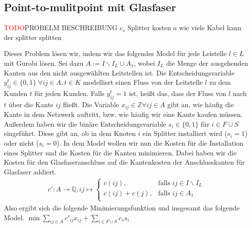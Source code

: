 \documentclass[11pt,a4paper]{article}
\newcommand{\Z}{\mathbb{Z}}
\newcommand{\Q}{\mathbb{Q}}
\newcommand{\TODO}{\textcolor{red}{TODO}}
\theoremstyle{my_th_style1}
\begin{document}
 \subsection{Point-to-mulitpoint mit Glasfaser}
\TODO PROBELM BESCHREIBUNG $c_s$ Splitter kosten $a$ wie viele Kabel kann der splitter splitten

Dieses Problem lösen wir, indem wir das folgendes Model für jede Leistelle $l \in L $ mit Gurobi lösen. Sei dazu $A:= I\backslash I_L \cup A_1$, wobei $I_L$ die Menge der ausgehenden Kanten aus den nicht ausgewählten Leitstellen ist.
Die Entscheidungsvariable $y_{ij}^t \in \{0,1\}\; \forall ij \in A, t \in K$ modelliert einen Fluss von der Leitstelle $l$ zu dem Kunden $t$ für jeden Kunden. Falls $y_{ij}^t=1$ ist, heißt das, dass der Fluss von $l$ nach $t$ über die Kante $ij$ fließt.
Die Variable $x_{ij} \in \Z \forall ij \in A $ gibt an, wie häufig die Kante in dem Netzwerk auftritt, bzw. wie häufig wir eine Kante kaufen müssen. Außerdem haben wir die binäre Entscheidungsvariable $s_i \in \{0,1\}$ für $i \in F \cup S$ eingeführt. Diese gibt an, ob in dem Knoten $i$ ein Splitter installiert wird ($s_i=1$) oder nicht ($s_i=0$). In dem Model wollen wir nun die Kosten für die Installation eines Splitter und die Kosten für die Kanten minimieren. Dabei haben wir die Kosten für den Glasfaseranschluss auf die Kantenkosten der Anschlusskanten für Glasfaser addiert.
\begin{align*}
c': A \rightarrow \Q, ij  \mapsto \left\{\begin{array}{cl} 
c(ij), & \text{falls } ij \in I\backslash I_L\\ 
c(ij)+c(j), & \text{falls } ij \in A_1\\ 
\end{array}
\right.
\end{align*}
Also ergibt sich die folgende Minimierungsfunktion und insgesamt das folgende Model.
 \bigskip
 $\min \displaystyle\sum_{ij \in A} c'_{ij} x_{ij} + \displaystyle\sum_{i \in F \cup S} c_s s_i $
\end{document}
